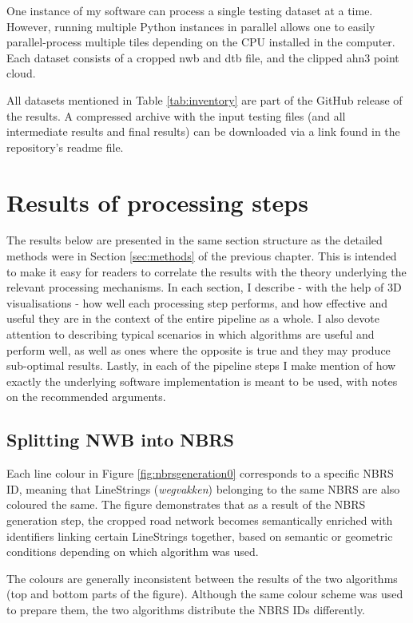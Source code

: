 One instance of my software can process a single testing dataset at a time. However, running multiple Python instances in parallel allows one to easily parallel-process multiple tiles depending on the CPU installed in the computer. Each dataset consists of a cropped \ac{nwb} and \ac{dtb} file, and the clipped \ac{ahn3} point cloud.

All datasets mentioned in Table \ref{tab:inventory} are part of the GitHub release of the results. A compressed archive with the input testing files (and all intermediate results and final results) can be downloaded via a link found in the repository's readme file.

\section{Results of processing steps}
\label{sec:results}

The results below are presented in the same section structure as the detailed methods were in Section \ref{sec:methods} of the previous chapter. This is intended to make it easy for readers to correlate the results with the theory underlying the relevant processing mechanisms. In each section, I describe - with the help of 3D visualisations - how well each processing step performs, and how effective and useful they are in the context of the entire pipeline as a whole. I also devote attention to describing typical scenarios in which algorithms are useful and perform well, as well as ones where the opposite is true and they may produce sub-optimal results. Lastly, in each of the pipeline steps I make mention of how exactly the underlying software implementation is meant to be used, with notes on the recommended arguments.

\subsection{Splitting NWB into NBRS}
\label{sub:r_nbrsgeneration}

Each line colour in Figure \ref{fig:nbrsgeneration0} corresponds to a specific NBRS ID, meaning that LineStrings (\textit{wegvakken}) belonging to the same NBRS are also coloured the same. The figure demonstrates that as a result of the NBRS generation step, the cropped road network becomes semantically enriched with identifiers linking certain LineStrings together, based on semantic or geometric conditions depending on which algorithm was used.

The colours are generally inconsistent between the results of the two algorithms (top and bottom parts of the figure). Although the same colour scheme was used to prepare them, the two algorithms distribute the NBRS IDs differently.

